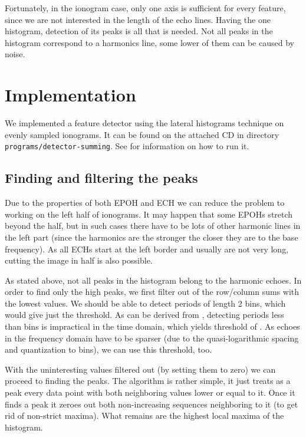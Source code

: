 Fortunately, in the ionogram case, only one axis is sufficient for every feature, since we are not interested in the length of the echo lines. Having the one histogram, detection of its peaks is all that is needed. Not all peaks in the histogram correspond to a harmonics line, some lower of them can be caused by noise.

\section{Implementation}
We implemented a feature detector using the lateral histograms technique on evenly sampled ionograms. It can be found on the attached CD in directory \texttt{programs/detector-summing}. See  for information on how to run it. 

\subsection{Finding and filtering the peaks}
Due to the properties of both EPOH and ECH we can reduce the problem to working on the left half of ionograms. It may happen that some EPOHs stretch beyond the half, but in such cases there have to be lots of other harmonic lines in the left part (since the harmonics are the stronger the closer they are to the base frequency). As all ECHs start at the left border and usually are not very long, cutting the image in half is also possible.

As stated above, not all peaks in the histogram belong to the harmonic echoes. In order to find only the high peaks, we first filter out  of the row/column sums with the lowest values. We should be able to detect periods of length 2 bins, which would give just the  threshold. As can be derived from \citep[p.~3]{Akalin2010}, detecting periods less than  bins is impractical in the time domain, which yields threshold of . As echoes in the frequency domain have to be sparser (due to the quasi-logarithmic spacing and quantization to bins), we can use this threshold, too.

With the uninteresting values filtered out (by setting them to zero) we can proceed to finding the peaks. The algorithm is rather simple, it just treats as a peak every data point with both neighboring values lower or equal to it. Once it finds a peak it zeroes out both non-increasing sequences neighboring to it (to get rid of non-strict maxima). What remains are the highest local maxima of the histogram.

